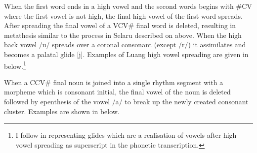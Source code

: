When the first word ends in a high vowel
and the second words begins with {\#}CV where the first vowel is not high,
the final high vowel of the first word spreads.
After spreading the final vowel of a VCV{\#} final word is deleted,
resulting in metathesis similar to the process in Selaru
described on  above.
When the high back vowel /u/ spreads over
a coronal consonant (except /r/) it
assimilates and becomes a palatal glide [j].
Examples of Luang high vowel spreading
are given in  below.\footnote{
		I follow \citet{tata15} in representing glides
		which are a realisation of vowels after
		high vowel spreading as superscript in the phonetic transcription.}

\begin{exe}	%
	\label{ex:LuaHigVowSpr}
\end{exe}

When a CCV{\#} final noun is joined into a single rhythm segment
with a morpheme which is consonant initial,
the final vowel of the noun is deleted followed by epenthesis
of the vowel /a/ to break up the newly created consonant cluster.
Examples are shown in  below.

